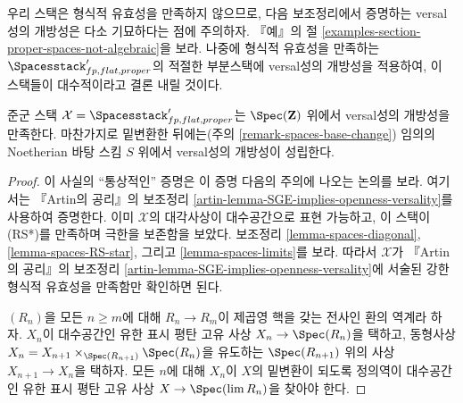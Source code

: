 \noindent
우리 스택은 형식적 유효성을 만족하지 않으므로, 다음 보조정리에서 증명하는
versal성의 개방성은 다소 기묘하다는 점에 주의하자. 『예』의 절
\ref{examples-section-proper-spaces-not-algebraic}을 보라. 나중에 형식적
유효성을 만족하는 $\Spacesstack'_{fp, flat, proper}$의 적절한 부분스택에
versal성의 개방성을 적용하여, 이 스택들이 대수적이라고 결론 내릴 것이다.

\begin{lemma}
\label{lemma-spaces-defo-thy}
준군 스택 $\mathcal{X} = \Spacesstack'_{fp, flat, proper}$는
$\Spec(\mathbf{Z})$ 위에서 versal성의 개방성을 만족한다. 마찬가지로
밑변환한 뒤에는(주의 \ref{remark-spaces-base-change}) 임의의 Noetherian
바탕 스킴 $S$ 위에서 versal성의 개방성이 성립한다.
\end{lemma}

\begin{proof}
이 사실의 ``통상적인'' 증명은 이 증명 다음의 주의에 나오는 논의를 보라.
여기서는 『Artin의 공리』의 보조정리
\ref{artin-lemma-SGE-implies-openness-versality}를 사용하여 증명한다.
이미 $\mathcal{X}$의 대각사상이 대수공간으로 표현 가능하고, 이 스택이
(RS*)를 만족하며 극한을 보존함을 보았다. 보조정리
\ref{lemma-spaces-diagonal}, \ref{lemma-spaces-RS-star}, 그리고
\ref{lemma-spaces-limits}를 보라. 따라서 $\mathcal{X}$가 『Artin의 공리』의
보조정리 \ref{artin-lemma-SGE-implies-openness-versality}에 서술된 강한 형식적
유효성을 만족함만 확인하면 된다.

\medskip\noindent
$(R_n)$을 모든 $n \geq m$에 대해 $R_n \to R_m$이 제곱영 핵을 갖는
전사인 환의 역계라 하자. $X_n$이 대수공간인 유한 표시 평탄 고유 사상
$X_n \to \Spec(R_n)$을 택하고, 동형사상
$X_n = X_{n + 1} \times_{\Spec(R_{n + 1})} \Spec(R_n)$을 유도하는
$\Spec(R_{n + 1})$ 위의 사상 $X_{n + 1} \to X_n$을 택하자. 모든 $n$에 대해
$X_n$이 $X$의 밑변환이 되도록 정의역이 대수공간인 유한 표시 평탄 고유 사상
$X \to \Spec(\lim R_n)$을 찾아야 한다.


\end{proof}
